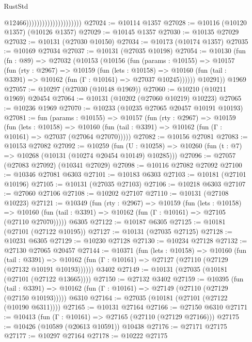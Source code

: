 \begin{lexlean}{RustStd}
\begin{coremodule}
                                              @12466)))))))))))))))))))))
@27024 := @10114 @1357
@27028 := @10116 (@10120 @1357) (@10126 @1357)
@27029 := @10145 @1357
@27030 := @10135 @27029
@27032 := @10131 (@27030 @10150)
@27034 := @10173 (@10174 @1357)
@27035 := @10169 @27034
@27037 := @10131 (@27035 @10198)
@27054 := @10130
    (fun (fn : @89) =>
    @27032
      (@10153
        (@10156
          (fun (params : @10155) =>
          @10157
            (fun (rty : @2967) =>
            @10159
              (fun (lets : @10158) =>
              @10160 (fun (tail : @3391) => @10162 (fun (Γ : @10161) => @27037 @10245))))))
        @10291))
    @1969
@27057 := @10297 (@27030 (@10148 @1969))
@27060 := @10210 (@10211 @1969) @20454
@27064 := @10131 (@10202 (@27060 @10219) @10223)
@27065 := @10236 @1969
@27070 := @10233 (@10235 @27065 @20457 @10191 @10193)
@27081 := fun (params : @10155) =>
  @10157
    (fun (rty : @2967) =>
    @10159
      (fun (lets : @10158) =>
      @10160 (fun (tail : @3391) => @10162 (fun (Γ : @10161) => @27037 (@27064 @27070)))))
@27082 := @10156 @27081
@27083 := @10153 @27082
@27092 := @10259
    (fun (U : @10258) => @10260 (fun (t : @7) => @10268 (@10131 (@10274 @20454 @10149) @10285)))
@27096 := @27057 (@27083 @27092) (@10341 @27029)
@27098 := @10116 @27082 @27092
@27100 := @10346 @27081 @6303
@27101 := @10183 @6303
@27103 := @10181 (@27101 @10196)
@27105 := @10131 (@27035 @27103)
@27106 := @10218 @6303
@27107 := @27060 @27106
@27108 := @10202 @27107
@27110 := @10131 (@27108 @10223)
@27121 := @10349
    (fun (rty : @2967) =>
    @10159
      (fun (lets : @10158) =>
      @10160 (fun (tail : @3391) => @10162 (fun (Γ : @10161) => @27105 (@27110 @27070)))))
    @6305
@27122 := @10187 @6305
@27125 := @10181 (@27101 (@27122 @10195))
@27127 := @10131 (@27035 @27125)
@27128 := @10231 @6305
@27129 := @10230 @27128
@27130 := @10234 @27128
@27132 := @27130 @27065 @20457
@27144 := @10371
    (fun (lets : @10158) =>
    @10160
      (fun (tail : @3391) =>
      @10162 (fun (Γ : @10161) => @27127 (@27110 (@27129 (@27132 @10191 @10193))))))
    @3402
@27149 := @10131 (@27035 (@10181 (@27101 (@27122 @13665))))
@27150 := @27132 @3402
@27159 := @10395
    (fun (tail : @3391) => @10162 (fun (Γ : @10161) => @27149 (@27110 (@27129 (@27150 @10193)))))
    @6310
@27164 := @27035 (@10181 (@27101 (@27122 (@10190 @6311))))
@27165 := @10131 @27164
@27166 := @27150 @6310
@27171 := @10413 (fun (Γ : @10161) => @27165 (@27110 (@27129 @27166)))
@27175 := @10426 (@10589 (@20613 @10591)) @10438
@27176 := @27171 @27175
@27177 := @10297 @27164
@27178 := @10222 @27175

\end{coremodule}
\end{lexlean}
